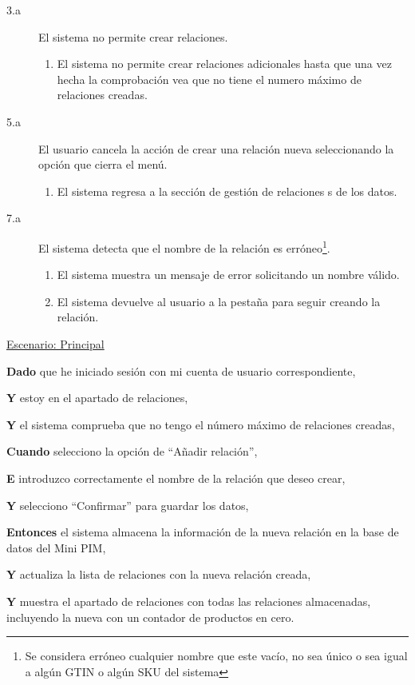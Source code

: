 \begin{description}

    \item[3.a] El sistema no permite crear relaciones.
    \begin{enumerate}
        \item[3.a.1] El sistema no permite crear relaciones adicionales hasta que una vez hecha la comprobación vea que no tiene el numero máximo de relaciones creadas.
    \end{enumerate}

    \item[5.a] El usuario cancela la acción de crear una relación nueva seleccionando la opción que cierra el menú.
    \begin{enumerate}
        \item[5.a.1] El sistema regresa a la sección de gestión de relaciones
    s de los datos.
    \end{enumerate}

    \item[7.a] El sistema detecta que el nombre de la relación es erróneo\footnote{Se considera erróneo cualquier nombre que este vacío, no sea único o sea igual a algún GTIN o algún SKU del sistema}.
    \begin{enumerate}
        \item[7.a.1] El sistema muestra un mensaje de error solicitando un nombre válido.
        \item[7.a.2] El sistema devuelve al usuario a la pestaña para seguir creando la relación.
    \end{enumerate}
\end{description}

\underline{Escenario: Principal}\par
\vspace{0.15cm}
\textbf{Dado} que he iniciado sesión con mi cuenta de usuario correspondiente,\par
\textbf{Y} estoy en el apartado de relaciones,\par
\textbf{Y} el sistema comprueba que no tengo el número máximo de relaciones creadas,\par
\textbf{Cuando} selecciono la opción de \enquote{Añadir relación},\par
\textbf{E} introduzco correctamente el nombre de la relación que deseo crear,\par
\textbf{Y} selecciono \enquote{Confirmar} para guardar los datos,\par
\textbf{Entonces} el sistema almacena la información de la nueva relación en la base de datos del Mini PIM,\par
\textbf{Y} actualiza la lista de relaciones con la nueva relación creada,\par
\textbf{Y} muestra el apartado de relaciones con todas las relaciones almacenadas, incluyendo la nueva con un contador de productos en cero.\par

